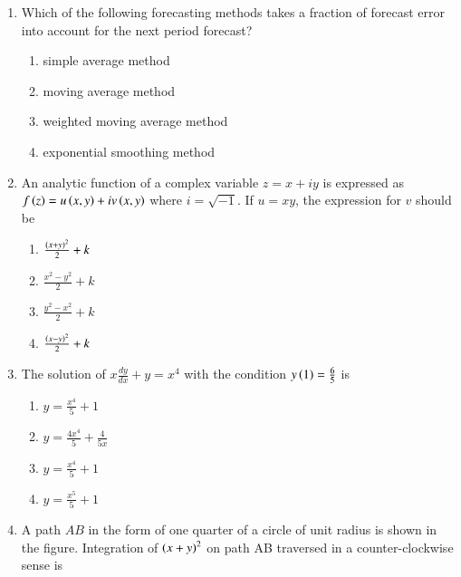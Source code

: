 \documentclass[journal]{IEEEtran}
\begin{document}
\begin{enumerate}
    \item Which of the following forecasting methods takes a fraction of forecast
    error into account for the next period forecast?
    \begin{multicols}{2}
    \begin{enumerate}
        \item simple average method
        \item moving average method
        \item weighted moving average method
        \item exponential smoothing method
    \end{enumerate}
    \end{multicols}

    \item An analytic function of a complex variable $z = x + iy$ is expressed as
    $f\left(z\right) = u\left(x, y\right) + iv\left(x, y\right)$ where $i = \sqrt{-1}$. If $u = xy$, the expression
    for $v$ should be
    \begin{multicols}{4}
    \begin{enumerate}
        \item $\frac{\left(x + y\right)^2}{2} + k$
        \item $\frac{x^2 - y^2}{2} + k$
        \item $\frac{y^2 - x^2}{2} + k$
        \item $\frac{\left(x - y\right)^2}{2} + k$
    \end{enumerate}
    \end{multicols}

    \item The solution of $x\frac{dy}{dx} + y = x^4$ with the condition
    $y\left(1\right) = \frac{6}{5}$ is
    \begin{multicols}{4}
    \begin{enumerate}
        \item $y = \frac{x^4}{5} + 1$
        \item $y = \frac{4x^4}{5} + \frac{4}{5x}$
        \item $y = \frac{x^4}{5} + 1$
        \item $y = \frac{x^5}{5} + 1$
    \end{enumerate}
    \end{multicols}

    \item A path $AB$ in the form of one quarter of a circle of unit radius is shown
    in the figure. Integration of $\left(x + y\right)^2$ on path AB traversed in a
    counter-clockwise sense is


\end{enumerate}
\end{document}
